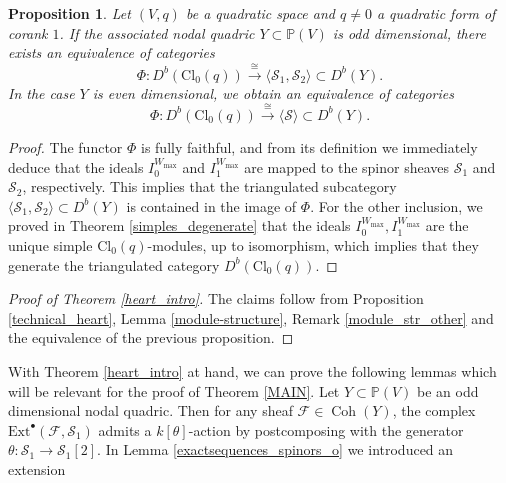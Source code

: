 \documentclass[a4paper, twoside, 11pt]{amsart}
\newtheorem{proposition}[theorem]{Proposition}
\theoremstyle{definition}
\theoremstyle{remark}
\numberwithin{equation}{theorem}
\DeclareMathOperator{\coh}{Coh}
\newcommand{\wmax}{W_{\text{max}}}
\newcommand{\evencl}{\mathrm{Cl}_0}
\begin{document}
\begin{proposition}\label{Mod_sheaf_equivalence}
    Let $(V,q)$ be a quadratic space and $q\neq 0$ a quadratic form of corank $1$. If the associated nodal quadric $Y \subset \mathbb{P}(V)$ is odd dimensional, there exists an equivalence of categories 
    \begin{equation*}
        \Phi\colon D^b(\evencl(q)) \overset{\cong}{\longrightarrow} \langle \mathcal{S}_1, \mathcal{S}_2 \rangle \subset D^b(Y).
    \end{equation*}
    In the case $Y$ is even dimensional, we obtain an equivalence of categories
    \begin{equation*}
        \Phi\colon D^b(\evencl(q)) \overset{\cong}{\longrightarrow} \langle \mathcal{S} \rangle \subset D^b(Y).
    \end{equation*}
\end{proposition}
\begin{proof}
    The functor $\Phi$ is fully faithful, and from its definition we immediately deduce that the ideals $I_0^{\wmax}$ and $ I_1^{\wmax}$ are mapped to the spinor sheaves $\mathcal{S}_1$ and $\mathcal{S}_2$, respectively. This implies that the triangulated subcategory $\langle \mathcal{S}_1, \mathcal{S}_2 \rangle \subset D^b(Y)$ is contained in the image of $\Phi$. For the other inclusion, we proved in Theorem \ref{simples_degenerate} that the ideals $I_0^{\wmax}, I_1^{\wmax}$ are the unique simple $\evencl(q)$-modules, up to isomorphism, which implies that they generate the triangulated category $D^b(\evencl(q))$.
\end{proof}
\begin{proof}[Proof of Theorem \ref{heart_intro}]
The claims follow from Proposition \ref{technical_heart}, Lemma \ref{module-structure}, Remark \ref{module_str_other} and the equivalence of the previous proposition.
\end{proof}
With Theorem \ref{heart_intro} at hand, we can prove the following lemmas 
which will be relevant for the proof of Theorem \ref{MAIN}. Let $Y \subset \mathbb{P}(V)$ be an odd dimensional nodal quadric. Then for any sheaf $\mathcal{F} \in \coh(Y)$, the complex $\mathrm{Ext}^{\bullet}(\mathcal{F},\mathcal{S}_1)$ admits a $k[\theta]$-action by postcomposing with the generator $\theta\colon \mathcal{S}_1 \to \mathcal{S}_1[2]$. In Lemma \ref{exactsequences_spinors_o} we introduced an extension
\end{document}
